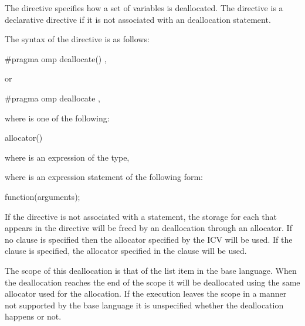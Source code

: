 \begin{ccppspecific}

\summary

The  directive specifies how a set of variables is deallocated.
The  directive is a declarative directive if it is not
associated with an deallocation statement.


\syntax
The syntax of the  directive is as follows:

\begin{boxedcode}
\#pragma omp deallocate() \plc{[clause[ [ [},\plc{] clause] ... ]] new-line}
\end{boxedcode}

or

\begin{boxedcode}
\#pragma omp deallocate \plc{[clause[ [ [},\plc{] clause] ... ]] new-line}
\end{boxedcode}


where  is one of the following:

\begin{indentedcodelist}
allocator()
\end{indentedcodelist}

where  is an expression of the  type,

where  is an expression statement of the following form:
\begin{codepar}
    function(arguments);
\end{codepar}


\descr

If the directive is not associated with a statement, the storage for each
 that appears in the directive will be freed by an deallocation
through an allocator.
If no clause is specified then the allocator specified by the
 ICV will be used.
If the  clause is specified, the allocator specified in the
clause will be used.

The scope of this deallocation is that of the list item in the base language.
When the deallocation reaches the end of the scope it will be deallocated using
the same allocator used for the allocation.
If the execution leaves the scope in a manner not supported by the base language
it is unspecified whether the deallocation happens or not.


\end{ccppspecific}
